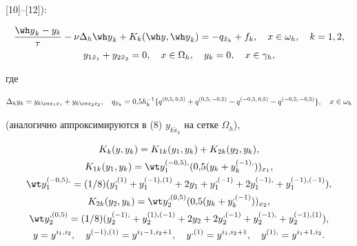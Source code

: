 [10]--[12]):


\begin{gather}


\frac{{\wh y}_k-y_k}{\tau}-\nu\Delta_h{\wh y}_k+


K_k(\wh y,{\wh y}_k)=-q_{\Tilde x_k}+f_k,\quad x\in\omega_h,


\quad k=1,2,\\


%


y_{1\Tilde x_1}+y_{2\Tilde x_2}=0,\quad


x\in\Omega_h,\quad y_k=0,\quad x\in\gamma_h,


\end{gather}


где


$$


\Delta_hy_k=y_{k\ov x_1x_1}+y_{k\ov x_2x_2},\quad q_{\tilde


x_k}=0{,}5h_k^{-1}\{q^{(0{,}5,\,0{,}5)}+


q^{(0{,}5,\,-0{,}5)}-q^{(-0{,}5,\,0{,}5)}- q^{(-0{,}5,\,-0{,}5)}\}, \quad


x\in\omega_h


$$


(аналогично аппроксимируются в (8) $y_{k\tilde


x_k}$ на сетке $\Omega_h$),


\begin{gather*}


K_k(y,y_k)=K_{1k}(y_1,y_k)+K_{2k}(y_2,y_k),\\


K_{1k}(y_1,y_k)=\wt y_1^{(-0{,}5),}(0{,}5(y_k+y_k^{(-1),}))_{x_1},\\


%


\wt y_1^{(-0{,}5),}=


(1/8)(y_1^{,(1)}+y_1^{(-1),(1)}+2y_1+y_1^{,(-1)}+


2y_1^{(-1),}+y_1^{(-1),(-1)}),\\


%


K_{2k}(y_2,y_k)=\wt


y_2^{,(0{,}5)}(0{,}5(y_k+y_k^{,(-1)}))_{x_2},\\


%


\wt y_2^{,(0{,}5)}=(1/8)(y_2^{(-1),}+y_2^{(1),(-1)}+2y_2+2y_2^{,(-1)}+


y_2^{(-1),}+y_2^{(-1),(1)}),\\


%


y=y^{i_1,i_2}, \quad y^{(-1),(1)}=y^{i_1-1,i_2+1}, \quad


y^{,(1)}=y^{i_1,i_2+1},\quad y^{(1),}=y^{i_1+1,i_2}.


\end{gather*}


